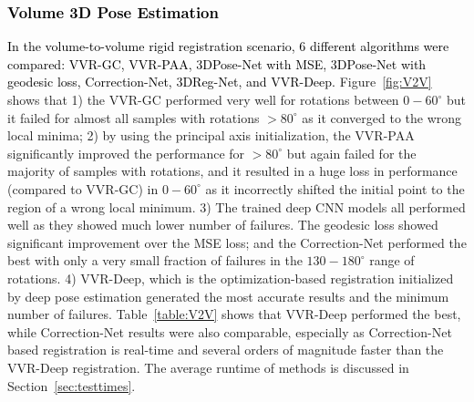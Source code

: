 \documentclass[journal,transmag]{IEEEtran}
\begin{document}
\subsubsection{\textcolor{black}{Volume 3D Pose Estimation}}
\textcolor{black}{In the volume-to-volume rigid registration scenario, 6 different algorithms were compared: VVR-GC, VVR-PAA, 3DPose-Net with MSE, 3DPose-Net with geodesic loss, Correction-Net, 3DReg-Net, and VVR-Deep.} Figure~\ref{fig:V2V} shows that 1) the VVR-GC performed very well for rotations between $0-60^\circ$ but it failed for almost all samples with rotations $>80^\circ$ as it converged to the wrong local minima; 2) by using the principal axis initialization, the VVR-PAA significantly improved the performance for $>80^\circ$ but again failed for the majority of samples with rotations, and it resulted in a huge loss in performance (compared to VVR-GC) in $0-60^\circ$ as it incorrectly shifted the initial point to the region of a wrong local minimum. 3) The trained deep CNN models all performed well as they showed much lower number of failures. The geodesic loss showed significant improvement over the MSE loss; and the Correction-Net performed the best with only a very small fraction of failures in the $130-180^\circ$ range of rotations. 4) VVR-Deep, which is the optimization-based registration initialized by deep pose estimation generated the most accurate results and the minimum number of failures. Table~\ref{table:V2V} shows that VVR-Deep performed the best, while Correction-Net results were also comparable, especially as Correction-Net based registration is real-time and several orders of magnitude faster than the VVR-Deep registration. The average runtime of methods is discussed in Section~\ref{sec:testtimes}. %


\end{document}

